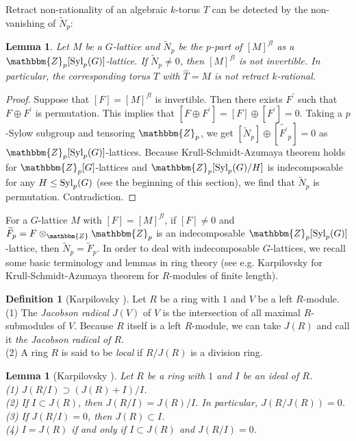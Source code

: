 \documentclass{amsart}
\theoremstyle{plain}
\newtheorem{lemma}[theorem]{Lemma}
\theoremstyle{definition}
\newtheorem{definition}[theorem]{Definition}
\theoremstyle{remark}
\newcommand{\bZ}{\mathbbm{Z}}\newcommand{\bQ}{\mathbbm{Q}}
\newcommand{\Syl}{{\rm Syl}}
\newcounter{sub}\def\tr{\mbox{tr }}
\begin{document}
Retract non-rationality of an algebraic $k$-torus $T$ 
can be detected by the non-vanishing of $\widetilde{N}_p$:

\begin{lemma}\label{lem7.3b}
Let $M$ be a $G$-lattice and 
$\widetilde{N}_p$ be the $p$-part of $[M]^{fl}$ as a $\bZ_p[\Syl_p(G)]$-lattice. 
If $\widetilde{N}_p\neq 0$, then $[M]^{fl}$ is not invertible. 
In particular, the corresponding torus $T$ 
with $\widehat{T}=M$ is not retract $k$-rational. 
\end{lemma}
\begin{proof}
Suppose that $[F]=[M]^{fl}$ is invertible. 
Then there exists $F^\prime$ such that $F\oplus F^\prime$ 
is permutation. 
This implies that 
$[F\oplus F^\prime]=[F]\oplus [F^\prime]=0$. 
Taking a $p$-Sylow subgroup and tensoring $\bZ_p$, 
we get $[\widetilde{N}_p]\oplus [\widetilde{F^\prime}_p]=0$ 
as $\bZ_p[\Syl_p(G)]$-lattices. 
Because Krull-Schmidt-Azumaya theorem holds for $\bZ_p[G]$-lattices 
and $\bZ_p[\Syl_p(G)/H]$ is indecomposable for any $H\leq \Syl_p(G)$ 
(see the beginning of this section), 
we find that $\widetilde{N}_p$ is permutation. 
Contradiction. 
\end{proof}

For a $G$-lattice $M$ with $[F]=[M]^{fl}$, 
if $[F]\neq 0$ and $\widetilde{F}_p=F \otimes_\bZ \bZ_p$
is an indecomposable $\bZ_p[\Syl_p(G)]$-lattice, 
then $\widetilde{N}_p=\widetilde{F}_p$. 
%
In order to deal with indecomposable $G$-lattices, 
we recall some basic terminology and lemmas in ring theory 
(see e.g. Karpilovsky \cite[Theorem 7.5 and Corollary 7.6]{Kar87} for Krull-Schmidt-Azumaya theorem for $R$-modules of finite length). 
%
\begin{definition}[{Karpilovsky \cite[Chapter 1, page 22, page 36]{Kar87}}]
Let $R$ be a ring with $1$ and $V$ be a left $R$-module.\\
{\rm (1)} 
The {\it Jacobson radical} $J(V)$ of $V$ 
is the intersection of all maximal $R$-submodules of $V$.
Because $R$ itself is a left $R$-module, 
we can take $J(R)$ and call it {\it the Jacobson radical of $R$}.\\
{\rm (2)} 
A ring $R$ is said to be {\it local} if $R/J(R)$ is a division ring.
\end{definition}

\begin{lemma}[{Karpilovsky \cite[Chapter 1, Corollary 6.17]{Kar87}}]
\label{lem7.5}
Let $R$ be a ring with $1$ and $I$ be an ideal of $R$.\\
{\rm (1)}
$J(R/I) \supset (J(R)+I)/I$.\\
{\rm (2)}
If $I \subset J(R)$,
then $J(R/I)=J(R)/I$.
In particular, $J(R/J(R))=0$.\\
{\rm (3)}
If $J(R/I)=0$, then $J(R) \subset I$.\\
{\rm (4)}
$I=J(R)$ if and only if $I \subset J(R)$ and $J(R/I)=0$.
\end{lemma}
\end{document}
